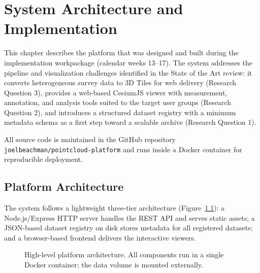 

\chapter{System Architecture and Implementation}
\label{ch:implementation}

This chapter describes the platform that was designed and built during the
implementation workpackage (calendar weeks 13--17). The system addresses the
pipeline and visualization challenges identified in the State of the Art review:
it converts heterogeneous survey data to 3D Tiles for web delivery (Research
Question 3), provides a web-based CesiumJS viewer with measurement, annotation,
and analysis tools suited to the target user groups (Research Question 2), and
introduces a structured dataset registry with a minimum metadata schema as a
first step toward a scalable archive (Research Question 1).

All source code is maintained in the GitHub repository
\texttt{joelbeachman/pointcloud-platform} and runs inside a Docker container
for reproducible deployment.

\section{Platform Architecture}
\label{sec:arch}

The system follows a lightweight three-tier architecture
(Figure~\ref{fig:architecture}): a Node.js/Express HTTP server handles the REST
API and serves static assets; a JSON-based dataset registry on disk stores
metadata for all registered datasets; and a browser-based frontend delivers
the interactive viewers.

\begin{figure}[h]
\centering
\caption{High-level platform architecture. All components run in a single
  Docker container; the data volume is mounted externally.}
\label{fig:architecture}
\end{figure}

